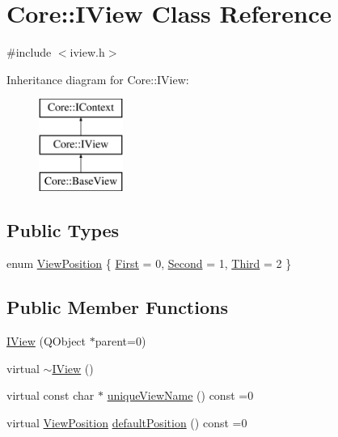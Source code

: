 \hypertarget{class_core_1_1_i_view}{\section{\-Core\-:\-:\-I\-View \-Class \-Reference}
\label{class_core_1_1_i_view}
}


{\ttfamily \#include $<$iview.\-h$>$}

\-Inheritance diagram for \-Core\-:\-:\-I\-View\-:\begin{figure}[H]
\begin{center}
\leavevmode
\includegraphics[height=3.000000cm]{class_core_1_1_i_view}
\end{center}
\end{figure}
\subsection*{\-Public \-Types}
\begin{DoxyCompactItemize}
\item 
enum \hyperlink{group___core_plugin_ga2423997830c6fd1ceb278f80dcbfc010}{\-View\-Position} \{ \hyperlink{group___core_plugin_gga2423997830c6fd1ceb278f80dcbfc010a82ca3e04bf84362ecb9b889c6bdc6980}{\-First} = 0, 
\hyperlink{group___core_plugin_gga2423997830c6fd1ceb278f80dcbfc010ae792ce1c0a152bc3cd353f3877c09d59}{\-Second} = 1, 
\hyperlink{group___core_plugin_gga2423997830c6fd1ceb278f80dcbfc010abeaccba28ffbb72a779d3e298bb60e4d}{\-Third} = 2
 \}
\end{DoxyCompactItemize}
\subsection*{\-Public \-Member \-Functions}
\begin{DoxyCompactItemize}
\item 
\hyperlink{group___core_plugin_gac77184abef47462a8a74a11c30356003}{\-I\-View} (\-Q\-Object $\ast$parent=0)
\item 
virtual \hyperlink{group___core_plugin_gad118ee9239c2009d156450064c6a89f1}{$\sim$\-I\-View} ()
\item 
virtual const char $\ast$ \hyperlink{group___core_plugin_ga122f26e5b4bd91ad1e8c38f0b4573870}{unique\-View\-Name} () const =0
\item 
virtual \hyperlink{group___core_plugin_ga2423997830c6fd1ceb278f80dcbfc010}{\-View\-Position} \hyperlink{group___core_plugin_ga452979cceabf4890999b3fa0f9a248c3}{default\-Position} () const =0
\end{DoxyCompactItemize}



